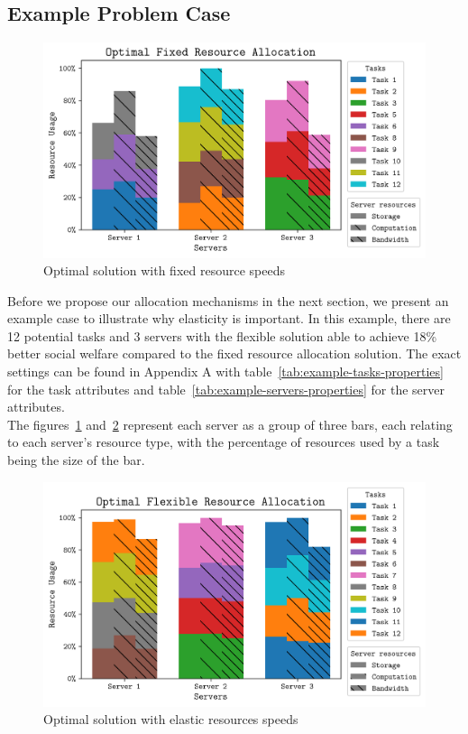 \subsection{Example Problem Case}
\label{subsec:example-problem-case}
\begin{figure}
    \centering
    \includegraphics[width=\linewidth]{figs/allocation/optimal_fixed_resource_allocation.png}
    \caption{Optimal solution with fixed resource speeds}
    \label{fig:example-fixed-allocation}
\end{figure}
Before we propose our allocation mechanisms in the next section, we present an example case to illustrate
why elasticity is important. In this example, there are 12 potential tasks and 3 servers with the flexible solution
able to achieve 18\% better social welfare compared to the fixed resource allocation solution.
The exact settings can be found in Appendix A with table~\ref{tab:example-tasks-properties}
for the task attributes and table~\ref{tab:example-servers-properties} for the server attributes. \\
The figures~\ref{fig:example-fixed-allocation} and~\ref{fig:example-flexible-allocation} represent each server as a
group of three bars, each relating to each server's resource type, with the percentage of resources used by a task
being the size of the bar.

\begin{figure}
    \centering
    \includegraphics[width=0.5\linewidth]{figs/allocation/optimal_flexible_resource_allocation.png}
    \caption{Optimal solution with elastic resources speeds}
    \label{fig:example-flexible-allocation}
\end{figure}

